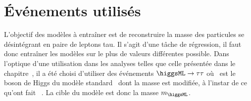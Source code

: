 \section{Événements utilisés}\label{chapter-ML-section-evt_gen}
L'objectif des modèles à entraîner est de reconstruire la masse des particules se désintégrant en paire de leptons tau.
Il s'agit d'une tâche de régression, il faut donc entraîner les modèles sur le plus de valeurs différentes possible.
Dans l'optique d'une utilisation dans les analyses telles que celle présentée dans le chapitre~,
il a été choisi d'utiliser des événements
$\higgsML\to\tau\tau$
où \higgsML\ est le boson de Higgs du modèle standard \higgs\ dont la masse est modifiée,
à l'instar de ce qu'ont fait \citeauthor{BARTSCHI201929}~\cite{BARTSCHI201929}.
La cible du modèle est donc la masse $m_{\higgsML}$.
